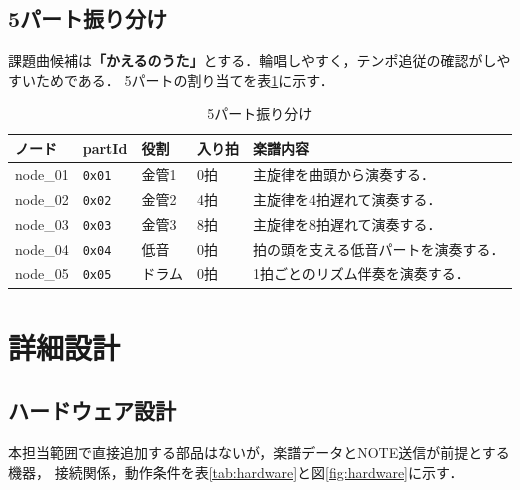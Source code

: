 \documentclass[uplatex,dvipdfmx]{jlreq}
\newcommand{\code}[1]{\texttt{#1}}
\begin{document}
\subsection{5パート振り分け}

課題曲候補は\textbf{「かえるのうた」}とする．輪唱しやすく，テンポ追従の確認がしやすいためである．
5パートの割り当てを表\ref{tab:part-map}に示す．

\begin{table}[H]
\centering
\caption{5パート振り分け}
\label{tab:part-map}
\begin{tabular}{p{}p{}p{}p{}p{}}
\toprule
\textbf{ノード} & \textbf{partId} & \textbf{役割} & \textbf{入り拍} & \textbf{楽譜内容} \\
\midrule
node\_01 & \code{0x01} & 金管1 & 0拍 & 主旋律を曲頭から演奏する．\\
node\_02 & \code{0x02} & 金管2 & 4拍 & 主旋律を4拍遅れて演奏する．\\
node\_03 & \code{0x03} & 金管3 & 8拍 & 主旋律を8拍遅れて演奏する．\\
node\_04 & \code{0x04} & 低音 & 0拍 & 拍の頭を支える低音パートを演奏する．\\
node\_05 & \code{0x05} & ドラム & 0拍 & 1拍ごとのリズム伴奏を演奏する．\\
\bottomrule
\end{tabular}
\end{table}

\section{詳細設計}

\subsection{ハードウェア設計}

本担当範囲で直接追加する部品はないが，楽譜データとNOTE送信が前提とする機器，
接続関係，動作条件を表\ref{tab:hardware}と図\ref{fig:hardware}に示す．
\end{document}
